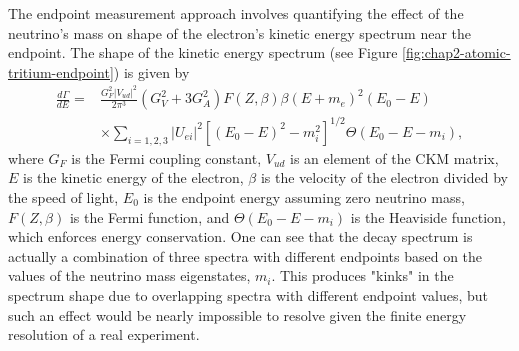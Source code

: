 The endpoint measurement approach involves quantifying the effect of the neutrino's mass on shape of the electron's kinetic energy spectrum near the endpoint. The shape of the kinetic energy spectrum (see Figure \ref{fig:chap2-atomic-tritium-endpoint}) is given by 
\begin{equation}
\begin{split}
    \frac{d\Gamma}{dE}=&\frac{G_F^2|V_{ud}|^2}{2\pi^3}(G_V^2+3G_A^2)F(Z,\beta)\beta(E+m_e)^2(E_0-E)\\
    &\times \sum_{i=1,2,3}{|U_{ei}|^2[(E_0-E)^2-m_i^2]^{1/2}\Theta(E_0-E-m_i)},
\end{split}
\end{equation}
where $G_F$ is the Fermi coupling constant, $V_{ud}$ is an element of the CKM matrix, $E$ is the kinetic energy of the electron, $\beta$ is the velocity of the electron divided by the speed of light, $E_0$ is the endpoint energy assuming zero neutrino mass, $F(Z,\beta)$ is the Fermi function, and $\Theta(E_0-E-m_i)$ is the Heaviside function, which enforces energy conservation. One can see that the decay spectrum is actually a combination of three spectra with different endpoints based on the values of the neutrino mass eigenstates, $m_i$. This produces "kinks" in the spectrum shape due to overlapping spectra with different endpoint values, but such an effect would be nearly impossible to resolve given the finite energy resolution of a real experiment. 


